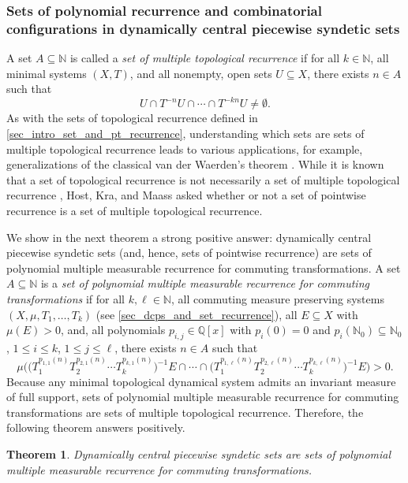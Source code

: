\documentclass[letter,11pt]{article}
\theoremstyle{plain}
\theoremstyle{definition}
\theoremstyle{plain}
\newcounter{MainTheoremCounter}
\newtheorem{Maintheorem}[MainTheoremCounter]{Theorem}
\theoremstyle{plain}
\numberwithin{equation}{section}
\newcommand{\N}{\mathbb{N}}
\newcommand{\Q}{\mathbb{Q}}
\renewcommand{\leq}{\leqslant}
\begin{document}
\subsubsection{Sets of polynomial recurrence and combinatorial configurations in dynamically central piecewise syndetic sets}

A set $A \subseteq \N$ is called a \emph{set of multiple topological recurrence} if for all $k \in \N$, all minimal systems $(X, T)$, and all nonempty, open sets $U \subseteq X$, there exists $n \in A$ such that
\[
    U \cap T^{-n} U \cap \cdots \cap T^{-kn} U \neq \emptyset.
\]
As with the sets of topological recurrence defined in \cref{sec_intro_set_and_pt_recurrence}, understanding which sets are sets of multiple topological recurrence leads to various applications, for example, generalizations of the classical van der Waerden's theorem \cite{van_der_waerden_1927}. While it is known that a set of topological recurrence is not necessarily a set of multiple topological recurrence \cite{frantzikinakis_lesigne_wierdl_2006}, Host, Kra, and Maass \cite[Question 2.14]{HostKraMaass2016} asked whether or not a set of pointwise recurrence is a set of multiple topological recurrence.



We show in the next theorem a strong positive answer: dynamically central piecewise syndetic sets (and, hence, sets of pointwise recurrence) are sets of polynomial multiple measurable recurrence for commuting transformations.  A set $A \subseteq \N$ is a \emph{set of polynomial multiple measurable recurrence for commuting transformations} if for all $k, \ell \in \N$, all commuting measure preserving systems $(X, \mu, T_1, \ldots, T_k)$ (see \cref{sec_dcps_and_set_recurrence}), all $E \subseteq X$ with $\mu(E) > 0$, and, all polynomials $p_{i,j} \in \Q[x]$ with $p_i(0) = 0$ and $p_i(\N_0) \subseteq \N_0$, $1 \leq i \leq k$, $1 \leq j \leq \ell$, there exists $n \in A$ such that
\[
    \mu\Big( \big(T_1^{p_{1,1}(n)} T_2^{p_{2,1}(n)} \cdots T_k^{p_{k,1}(n)} \big)^{-1} E \cap \cdots \cap \big(T_1^{p_{1,\ell}(n)} T_2^{p_{2,\ell}(n)} \cdots T_k^{p_{k,\ell}(n)} \big)^{-1} E \Big) > 0.
\]
Because any minimal topological dynamical system admits an invariant measure of full support, sets of polynomial multiple measurable recurrence for commuting transformations are sets of multiple topological recurrence. Therefore, the following theorem answers \cite[Question 2.14]{HostKraMaass2016} positively.


\begin{Maintheorem}
\label{thm:dcps_multiple_recurrence}
    Dynamically central piecewise syndetic sets are sets of polynomial multiple measurable recurrence for commuting transformations.
\end{Maintheorem}
\end{document}
